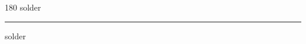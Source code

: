 
\begin{frame}
\begin{center}
\begin{turn}{180}
{\fontsize{2.5cm}{1em}\selectfont solder}
\end{turn}
\vspace{1em}\par  
\hrule
\vspace{1em}\par  
{\fontsize{2.5cm}{1em}\selectfont solder}
\end{center}
\end{frame}
